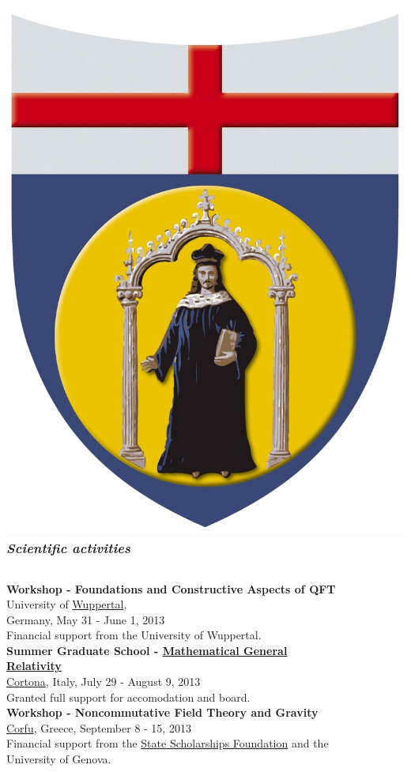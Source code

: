 \documentclass[a4paper,11pt]{beamer} %
\newcommand{\LogoUnivGenova}{\protect\includegraphics[scale=0.015]{fig_genova.JPG}} %
\begin{document}
\begin{frame}
\frametitle{\LogoUnivGenova {} \emph{\small{Scientific activities}}}
\scriptsize
\begin{columns}
\begin{column}{.76\textwidth}
\quad \textbf{Workshop - Foundations and Constructive Aspects of QFT} \\
University of \href{http://www2.math.uni-wuppertal.de/~schenkel/LQP32/LQP32.html}{Wuppertal}, \\
Germany, May 31 - June 1, 2013 \\
Financial support from the University of Wuppertal. \\
\vspace{6mm}
\quad \textbf{Summer Graduate School - \href{http://www.msri.org/summer_schools/718}{Mathematical General Relativity}} \\
\href{http://www.altamatematica.it/MathGenRelativity/}{Cortona}, Italy, July 29 - August 9, 2013 \\
Granted full support for accomodation and board. \\
\vspace{6mm}
\quad \textbf{Workshop - Noncommutative Field Theory and Gravity} \\
\href{http://www.physics.ntua.gr/corfu2013/nc.html}{Corfu}, Greece, September 8 - 15, 2013 \\
Financial support from the \href{http://www.iky.gr/en/}{State Scholarships Foundation} and the University of Genova.
\end{column}
\hfill
\begin{column}{.20\textwidth}
\begin{figure}[h]
 \\
 \\

\end{figure}
\end{column}
\end{columns}
\end{frame}
\end{document}
